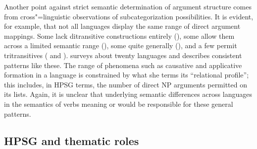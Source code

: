 \documentclass[output=paper,biblatex,babelshorthands,newtxmath,draftmode,colorlinks, citecolor=brown]{langscibook}
\begin{document}
Another point against strict semantic determination of argument structure comes from cross"=linguistic observations of subcategorization possibilities.
It is evident, for example, that not all languages display the same range of direct argument mappings.
Some lack ditransitive constructions entirely (), some allow them across a limited semantic range (), some quite generally (), and a few permit tritransitives ( and ).
\citet{Gerdts1992} surveys about twenty languages and describes consistent patterns like these.
The range of phenomena such as causative and applicative formation in a language is constrained by what she terms its ``relational profile''; this includes, in HPSG terms, the number of direct NP arguments permitted on its \argst lists.
Again, it is unclear that underlying semantic differences across languages in the semantics of verbs meaning  or  would be responsible for these general patterns.%


\subsection{HPSG and thematic roles}
\label{thetaroles}
\end{document}
